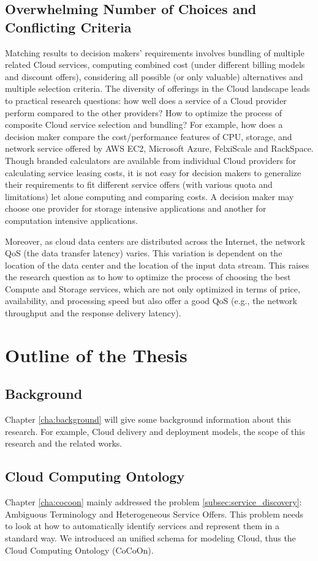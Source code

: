 \subsection{Overwhelming Number of Choices and Conflicting Criteria}
\label{subsec:service_comparison}
Matching results to decision makers’ requirements
involves bundling of multiple related Cloud services,
computing combined cost (under different billing models and
discount offers), considering all possible (or only valuable)
alternatives and multiple selection criteria. 
The diversity of offerings in the Cloud landscape
leads to practical research questions: how well does a service
of a Cloud provider perform compared to the other providers? 
How to optimize the process of composite Cloud service selection and
bundling? For example, how does a decision maker compare
the cost/performance features of CPU, storage, and network
service offered by AWS EC2, Microsoft Azure, FelxiScale and RackSpace. 
Though branded calculators are available from individual Cloud providers for
calculating service leasing costs, it is not easy for decision
makers to generalize their requirements to fit different
service offers (with various quota and limitations) let alone
computing and comparing costs. A decision
maker may choose one provider for storage intensive
applications and another for computation intensive
applications. 

Moreover, as cloud data centers are distributed across the Internet,
the network QoS (the data transfer latency) varies. This
variation is dependent on the location of the data center and the
location of the input data stream. This raises
the research question as to how to optimize the process of
choosing the best Compute and Storage services, which are not
only optimized in terms of price, availability, and processing
speed but also offer a good QoS (e.g., the network throughput
and the response delivery latency).

\section{Outline of the Thesis}
\subsection{Background}
Chapter \ref{cha:background} will give some background information about this research. For example, Cloud delivery and deployment models, the scope of this research and the related works.

\subsection{Cloud Computing Ontology}
\label{sec:CloudComputingOntology}
Chapter \ref{cha:cocoon} mainly addressed the problem \ref{subsec:service_discovery}: Ambiguous Terminology and Heterogeneous Service Offers. This problem needs to look at how to automatically identify services and represent them in a standard way.
We introduced an unified schema for modeling Cloud, thus
the Cloud Computing Ontology (CoCoOn).

